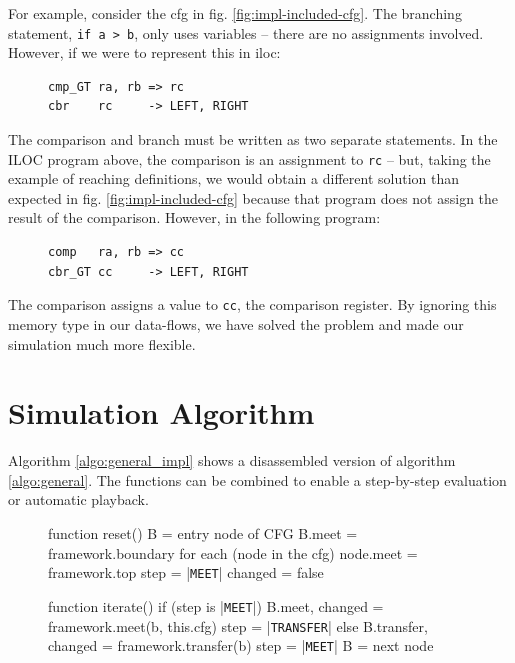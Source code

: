 \documentclass[bsc,twoside,singlespacing,parskip,logo,notimes,normalheadings]{infthesis}
\begin{document}
    For example, consider the \gls{cfg} in
    fig. \ref{fig:impl-included-cfg}. The branching statement, {\tt if
      a > b}, only uses variables -- there are no assignments
    involved. However, if we were to represent this in \gls{iloc}:

    \begin{figure}[!h]
\begin{verbatim}
cmp_GT ra, rb => rc
cbr    rc     -> LEFT, RIGHT
\end{verbatim}
    \end{figure}

    The comparison and branch must be written as two separate
    statements. In the ILOC program above, the comparison is an
    assignment to {\tt rc} -- but, taking the example of reaching
    definitions, we would obtain a different solution than expected in
    fig. \ref{fig:impl-included-cfg} because that program does not
    assign the result of the comparison. However, in the following
    program:

    \begin{figure}[!h]
\begin{verbatim}
comp   ra, rb => cc
cbr_GT cc     -> LEFT, RIGHT
\end{verbatim}
    \end{figure}
    
    The comparison assigns a value to {\tt cc}, the comparison
    register. By ignoring this memory type in our data-flows, we have
    solved the problem and made our simulation much more flexible.


    \section{Simulation Algorithm}\label{sec:impl-simulation}
    Algorithm \ref{algo:general_impl} shows a disassembled version of
    algorithm \ref{algo:general}. The functions can be combined to
    enable a step-by-step evaluation or automatic playback.

    \begin{figure}[!ht]
      \vspace{-5mm}
    \begin{algorithm}[caption={Implementation of General Framework Algorithm}, label={algo:general_impl},escapeinside={||},mathescape=true]
function reset()
    B = entry node of CFG
    B.meet = framework.boundary
    for each (node in the cfg)
        node.meet = framework.top
    step    = |{\tt MEET}|
    changed = false

function iterate()
    if (step is |{\tt MEET}|)
        B.meet, changed = framework.meet(b, this.cfg)
        step = |{\tt TRANSFER}|
    else
        B.transfer, changed = framework.transfer(b)
        step = |{\tt MEET}|
        B    = next node
    \end{algorithm}
      \vspace{-5mm}
    \end{figure}
\end{document}
